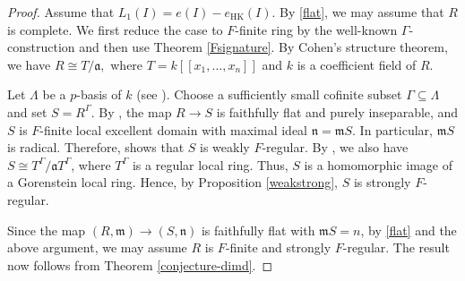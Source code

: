 \documentclass[11pt, reqno]{amsart}
\theoremstyle{plain}
\newcommand{\m}{\mathfrak{m}}
\newcommand{\n}{\mathfrak{n}}
\theoremstyle{plain}
\begin{document}
\begin{proof}

Assume that $L_1(I)=e(I)-e_{\mathrm{HK}}(I).$ By \ref{flat}, we may assume that $R$ is complete. We first reduce the case to $F$-finite ring by the well-known $\Gamma$-construction and then use Theorem \ref{Fsignature}. By Cohen's structure theorem, we have $R\cong T/\mathfrak a,$ where $T=k[[x_1,\ldots,x_n]]$ and $k$ is a coefficient field of $R.$ 

Let $\Lambda$ be a $p$-basis of $k$ (see \cite[3.1]{strong}). Choose a sufficiently small cofinite subset $\Gamma\subseteq\Lambda$ and set $S=R^\Gamma.$ By \cite[6.11, 6.13]{HH94}, the map $R\to S$ is faithfully flat and purely inseparable, and $S$ is $F$-finite local excellent domain with maximal ideal $\n=\m S$. In particular, $\m S$ is radical.
Therefore, \cite[Theorem~6.17(b)]{HH94} shows that
$S$ is weakly $F$-regular. By \cite[Lemma~6.6(a,b)]{HH94}, we also have $S\cong T^{\Gamma}/\mathfrak a T^{\Gamma}$, where $T^{\Gamma}$ is a regular local ring. Thus, $S$ is a homomorphic image of a Gorenstein local ring. Hence, by Proposition \ref{weakstrong}, $S$ is strongly $F$-regular.

Since the map $(R,\m)\to (S,\n)$ is faithfully flat with $\m S=n$, by \ref{flat} and the above argument, we may assume $R$ is $F$-finite and strongly $F$-regular. The result now follows from Theorem \ref{conjecture-dimd}. 
\end{proof}

\end{document}
